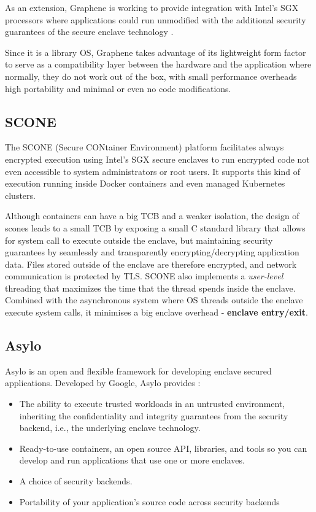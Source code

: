 As an extension, Graphene is working to provide integration with Intel's \gls{SGX} processors where applications could run unmodified with the additional security guarantees of the secure enclave technology \cite{graphene:2}.

Since it is a library OS, Graphene takes advantage of its lightweight form factor to serve as a compatibility layer between the hardware and the application where normally, they do not work out of the box, with small performance overheads high portability and minimal or even no code modifications.

\subsection{SCONE}
\label{ssec:scone}

The SCONE \cite{scone:1} (Secure CONtainer Environment) platform facilitates always encrypted execution using Intel's \gls{SGX} secure enclaves to run encrypted code not even accessible to system administrators or root users. It supports this kind of execution running inside Docker containers and even managed Kubernetes clusters.

Although containers can have a big \gls{TCB} and a weaker isolation, the design of scones leads to a small \gls{TCB} by exposing a small C standard library that allows for system call to execute outside the enclave, but maintaining security guarantees by seamlessly and transparently encrypting/decrypting application data. Files stored outside of the enclave are therefore encrypted, and network communication is protected by \gls{TLS}. SCONE also implements a \textit{user-level} threading that maximizes the time that the thread spends inside the enclave. Combined with the asynchronous system where OS threads outside the enclave execute system calls, it minimises a big enclave overhead - \textbf{enclave entry/exit}.

\subsection{Asylo}
\label{ssec:asylo}

Asylo \cite{asylo:1} is an open and flexible framework for developing enclave secured applications. Developed by Google, Asylo provides \cite{asylo:2}:

\begin{itemize}
  \item The ability to execute trusted workloads in an untrusted environment, inheriting the confidentiality and integrity guarantees from the security backend, i.e., the underlying enclave technology.
  \item Ready-to-use containers, an open source API, libraries, and tools so you can develop and run applications that use one or more enclaves.
  \item A choice of security backends.
  \item Portability of your application's source code across security backends
\end{itemize}

